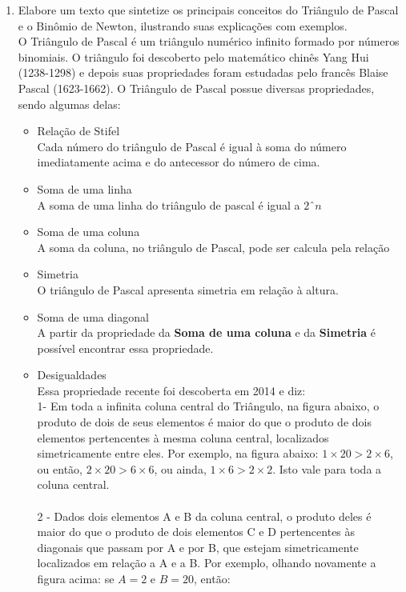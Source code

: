 \documentclass[a4paper, 12pt]{article}
\begin{document}
\begin{enumerate}
\item Elabore um texto que sintetize os principais conceitos do Triângulo de Pascal e o Binômio de Newton, ilustrando suas explicações com exemplos.\\
 O Triângulo de Pascal é um triângulo numérico infinito formado por números binomiais. O triângulo foi descoberto pelo matemático chinês Yang Hui (1238-1298)
e depois suas propriedades foram estudadas pelo francês Blaise Pascal (1623-1662). O Triângulo de Pascal possue diversas propriedades, sendo algumas delas:\\
\begin{itemize}
\item Relação de Stifel\\
Cada número do triângulo de Pascal é igual à soma do número imediatamente acima e do antecessor do número de cima.
\item Soma de uma linha\\
A soma de uma linha do triângulo de pascal é igual a $2ˆn$
\item Soma de uma coluna\\
A soma da coluna, no triângulo de Pascal, pode ser calcula pela relação
\item Simetria\\
O triângulo de Pascal apresenta simetria em relação à altura.
\item Soma de uma diagonal\\
A partir da propriedade da \textbf{Soma de uma coluna} e da \textbf{Simetria} é possível encontrar essa propriedade.
\item Desigualdades\\
Essa propriedade recente foi descoberta em 2014 e diz: \\
1- Em toda a infinita coluna central do Triângulo, na figura abaixo, o produto de dois de seus elementos é maior do que o produto de dois elementos pertencentes à mesma coluna central, localizados simetricamente entre eles. Por exemplo, na figura abaixo: $1 \times 20 > 2 \times 6$, ou então, $2 \times 20 > 6 \times 6$, ou ainda, $1 \times 6 > 2 \times 2$. Isto vale para toda a coluna central.\\\\
2 - Dados dois elementos A e B da coluna central, o produto deles é maior do que o produto de dois elementos C e D pertencentes às diagonais que passam por A e por B, que estejam simetricamente localizados em relação a A e a B. Por exemplo, olhando novamente a figura acima: se $A = 2$ e $B = 20$, então:\\\\


\end{itemize}
\end{enumerate}
\end{document}
